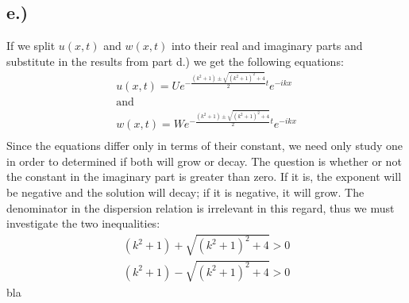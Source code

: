 \documentclass{article}
\begin{document}
\subsection*{e.)}
If we split $u(x, t)$ and $w(x,t)$ into their real and imaginary parts and substitute in the results from part d.) we get the following equations:
\begin{equation}
\begin{aligned}
u(x, t) = Ue^{-\frac{(k^2 + 1) \pm \sqrt{(k^2 + 1)^2 +4}}{2}t}e^{-ikx}\\
\text{and}\\
w(x, t) = We^{-\frac{(k^2 + 1) \pm \sqrt{(k^2 + 1)^2 +4}}{2}t}e^{-ikx}\\
\end{aligned}
\end{equation}
Since the equations differ only in terms of their constant, we need only study one in order to determined if both will grow or decay. The question is whether or not the constant in the imaginary part is greater than zero. If it is, the exponent will be negative and the solution will decay; if it is negative, it will grow. The denominator in the dispersion relation is irrelevant in this regard, thus we must investigate the two inequalities:
\begin{equation}
\begin{aligned}
(k^2 + 1) + \sqrt{(k^2 + 1)^2 +4} > 0\\
(k^2 + 1) - \sqrt{(k^2 + 1)^2 +4} > 0
\end{aligned}
\end{equation}
bla
\end{document}
